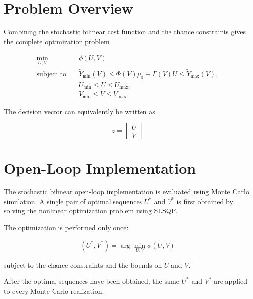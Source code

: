 \section{Problem Overview}
\label{sec:sb_problem_overview}

Combining the stochastic bilinear cost function and the chance constraints
gives the complete optimization problem

\begin{equation}
\boxed{
\begin{aligned}
    \min_{U,V}
    \quad &
    \phi(U,V)
    \\[1mm]
    \text{subject to}
    \quad &
    \tilde{Y}_{\min}(V)
    \leq
    \Phi(V)\mu_0+\Gamma(V)U
    \leq
    \tilde{Y}_{\max}(V),
    \\
    &
    U_{\min}
    \leq U \leq
    U_{\max},
    \\
    &
    V_{\min}
    \leq V \leq
    V_{\max}
\end{aligned}
}
\label{eq:sb_final_problem}
\end{equation}

The decision vector can equivalently be written as

\begin{equation}
    z=
    \begin{bmatrix}
        U\\
        V
    \end{bmatrix}
\end{equation}


\section{Open-Loop Implementation}
\label{sec:sb_open_loop}

The stochastic bilinear open-loop implementation is evaluated using Monte
Carlo simulation. A single pair of optimal sequences \(U^\ast\) and \(V^\ast\)
is first obtained by solving the nonlinear optimization problem using SLSQP.

The optimization is performed only once:

\begin{equation}
    (U^\ast,V^\ast)
    =
    \arg\min_{U,V}\phi(U,V)
\end{equation}

subject to the chance constraints and the bounds on \(U\) and \(V\).

After the optimal sequences have been obtained, the same \(U^\ast\) and
\(V^\ast\) are applied to every Monte Carlo realization.


